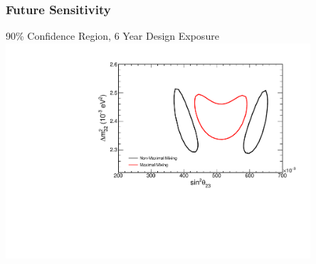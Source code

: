 \documentclass[10pt,professionalfonts,xcolor=table]{beamer}
\begin{document}
\begin{frame}
\frametitle{Future Sensitivity}
\centering
\textcolor{custom_red}{90\% Confidence Region, 6 Year Design Exposure}
\vspace{-15pt}
\includegraphics[angle=-90, width=0.85\textwidth]{figures/results/contours6yr.pdf}

\end{frame}
\end{document}
